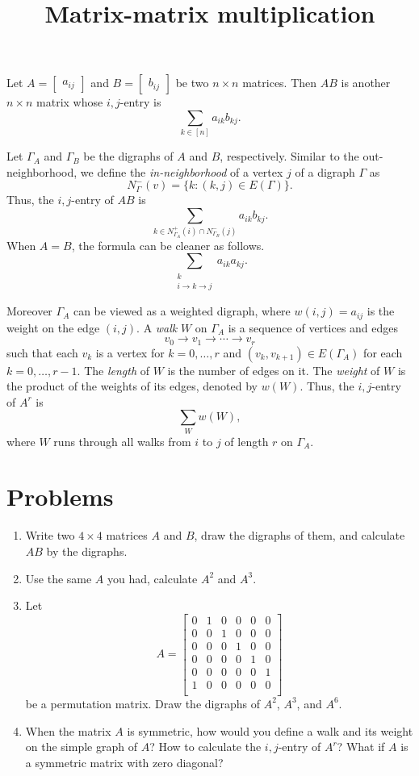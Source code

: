 \documentclass{article}
\title{Matrix-matrix multiplication}
\date{\vspace{-1cm}}
\theoremstyle{definition}
\begin{document}
\maketitle
\large

Let $A = \begin{bmatrix} a_{ij} \end{bmatrix}$ and $B = \begin{bmatrix} b_{ij} \end{bmatrix}$ be two $n\times n$ matrices.  Then $AB$ is another $n\times n$ matrix whose $i,j$-entry is
\[\sum_{k\in[n]}a_{ik}b_{kj}.\]

Let $\Gamma_A$ and $\Gamma_B$ be the digraphs of $A$ and $B$, respectively.  Similar to the out-neighborhood, we define the \emph{in-neighborhood} of a vertex $j$ of a digraph $\Gamma$ as 
\[N^-_\Gamma(v) = \{k : (k,j) \in E(\Gamma)\}.\]
Thus, the $i,j$-entry of $AB$ is  
\[\sum_{k\in N^+_{\Gamma_A}(i)\cap N^-_{\Gamma_B}(j)}a_{ik}b_{kj}.\]
When $A = B$, the formula can be cleaner as follows.  
\[\sum_{\substack{k\\ i\rightarrow k\rightarrow j}}a_{ik}a_{kj}.\]

Moreover $\Gamma_A$ can be viewed as a weighted digraph, where $w(i,j) = a_{ij}$ is the weight on the edge $(i,j)$.  
A \emph{walk} $W$ on $\Gamma_A$ is a sequence of vertices and edges
\[v_0\rightarrow v_1\rightarrow \cdots \rightarrow v_r\]
such that each $v_k$ is a vertex for $k=0,\ldots,r$ and $(v_k,v_{k+1})\in E(\Gamma_A)$ for each $k = 0,\ldots, r-1$.  The \emph{length} of $W$ is the number of edges on it.  The \emph{weight} of $W$ is the product of the weights of its edges, denoted by $w(W)$.  Thus, the $i,j$-entry of $A^r$ is 
\[\sum_{W}w(W),\]
where $W$ runs through all walks from $i$ to $j$ of length $r$ on $\Gamma_A$. 
\section*{Problems}
\begin{enumerate}
\setlength\itemsep{2em}
\item Write two $4\times 4$ matrices $A$ and $B$, draw the digraphs of them, and calculate $AB$ by the digraphs.
\item Use the same $A$ you had, calculate $A^2$ and $A^3$.
\item Let 
\[A = \begin{bmatrix} 
 0 & 1 & 0 & 0 & 0 & 0 \\
 0 & 0 & 1 & 0 & 0 & 0 \\
 0 & 0 & 0 & 1 & 0 & 0 \\
 0 & 0 & 0 & 0 & 1 & 0 \\
 0 & 0 & 0 & 0 & 0 & 1 \\
 1 & 0 & 0 & 0 & 0 & 0 \\
\end{bmatrix}\] 
 be a permutation matrix.  Draw the digraphs of $A^2$, $A^3$, and $A^6$.
\item When the matrix $A$ is symmetric, how would you define a walk and its weight on the simple graph of $A$?  How to calculate the $i,j$-entry of $A^r$?  What if $A$ is a symmetric matrix with zero diagonal?
\end{enumerate}

\end{document}
